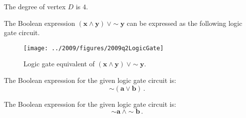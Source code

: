 \begin{subquestions}

\subquestion

The degree of vertex $D$ is $4$.


\subquestion

The Boolean expression $\boldsymbol{(x \land y) ~\lor \sim y}$ can be expressed as the following logic gate circuit.
\begin{figure}[H]
	\begin{center}
		\texttt{[image: ../2009/figures/2009q2LogicGate]}
		\caption{\label{2009:q2:fig:LogicGates} Logic gate equivalent of $\boldsymbol{(x \land y) ~\lor \sim y}$.}
	\end{center}
\end{figure}


\subquestion

\begin{subsubquestions}
	

\subsubquestion
The Boolean expression for the given logic gate circuit is:
\begin{equation}
	\boldsymbol{\sim (a \lor b)}\,.
\end{equation}


\subsubquestion
The Boolean expression for the given logic gate circuit is:
\begin{equation}
	\boldsymbol{\sim a ~\land \sim b}\,.
\end{equation}



\end{subsubquestions}
\end{subquestions}
